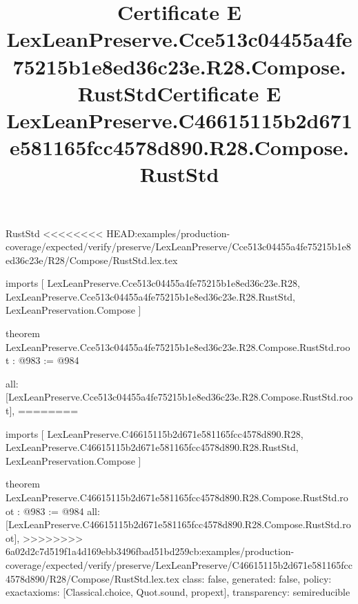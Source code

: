 \begin{lexlean}{RustStd}
<<<<<<<< HEAD:examples/production-coverage/expected/verify/preserve/LexLeanPreserve/Cce513c04455a4fe75215b1e8ed36c23e/R28/Compose/RustStd.lex.tex
\title{Certificate E LexLeanPreserve.Cce513c04455a4fe75215b1e8ed36c23e.R28.Compose.RustStd}
\begin{coremodule}
imports [
  LexLeanPreserve.Cce513c04455a4fe75215b1e8ed36c23e.R28,
  LexLeanPreserve.Cce513c04455a4fe75215b1e8ed36c23e.R28.RustStd,
  LexLeanPreservation.Compose
]

theorem LexLeanPreserve.Cce513c04455a4fe75215b1e8ed36c23e.R28.Compose.RustStd.root : @983 := @984 {
  all: [LexLeanPreserve.Cce513c04455a4fe75215b1e8ed36c23e.R28.Compose.RustStd.root],
========
\title{Certificate E LexLeanPreserve.C46615115b2d671e581165fcc4578d890.R28.Compose.RustStd}
\begin{coremodule}
imports [
  LexLeanPreserve.C46615115b2d671e581165fcc4578d890.R28,
  LexLeanPreserve.C46615115b2d671e581165fcc4578d890.R28.RustStd,
  LexLeanPreservation.Compose
]

theorem LexLeanPreserve.C46615115b2d671e581165fcc4578d890.R28.Compose.RustStd.root : @983 := @984 {
  all: [LexLeanPreserve.C46615115b2d671e581165fcc4578d890.R28.Compose.RustStd.root],
>>>>>>>> 6a02d2c7d519f1a4d169ebb3496fbad51bd259cb:examples/production-coverage/expected/verify/preserve/LexLeanPreserve/C46615115b2d671e581165fcc4578d890/R28/Compose/RustStd.lex.tex
  class: false,
  generated: false,
  policy: exact{axioms: [Classical.choice, Quot.sound, propext]},
  transparency: semireducible
}


\end{coremodule}}
\end{coremodule}
\end{lexlean}
